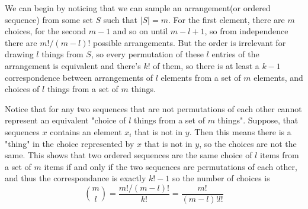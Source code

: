\documentclass[11pt,onecolumn]{article}
\begin{document}
\begin{answer}

We can begin by noticing that we can sample an arrangement(or ordered sequence) from some set $S$ such that $|S|=m$. For the first element, there are $m$ choices, for the second $m-1$ and so on until $m-l+1$, so from independence there are $m!/(m-l)!$ possible arrangements. But the order is irrelevant for drawing $l$ things from $S$, so every permutation of these $l$ entries of the arrangement is equivalent and there's $k!$ of them, so there is at least a $k-1$ correspondence between arrangements of $l$ elements from a set of $m$ elements, and choices of $l$ things from a set of $m$ things. 

Notice that for any two sequences that are not permutations of each other cannot represent an equivalent "choice of $l$ things from a set of $m$ things". Suppose, that sequences $x$ contains an element $x_i$ that is not in $y$. Then this means there is a "thing" in the choice represented by $x$ that is not in $y$, so the choices are not the same. This shows that two ordered sequences are the same choice of $l$ items from a set of $m$ items if and only if the two sequences are permutations of each other, and thus the correspondance is exactly $k!-1$ so the number of choices is
$$ \binom{m}{l} = \frac{m!/(m-l)!}{k!} = \frac{m!}{(m-l)!l!} $$

\begin{comment}
Choosing $l$ items from a set of $m$ items without replacement amounts to enumerating the elements in the set (listing them as a tuple, where the first entry corresponds to the first enumerated item) which is possible since $m < \infty$, permuting the elements, and choosing the first $l$ elements in the permutation. There are $m!$ ways of permuting the tuple of size $m$, but we dont care about the order of the first $l$ elements, or the order of the last $m-l$ elements, Hence, 
$$ \binom{m}{l} = \frac{m!}{l!(m-l)!} $$

Another way to see this: we can enumerate the items in the set $S$ that we are sampling from, so that we can represent any subset as a binary vector $v$ where $v_i = 1$ if the ith item is in the subset of interest, and $v_i = 0$ otherwise. Then, choosing a subset $H \subseteq S$ such that $|H|=l$ amounts to finding a binary vector $v$ with exactly $l$ ones. There are $m!$ permutations of such a vector $v$, but since the $0$ and $1$ respectively are not unique, then any permutation of the 0s or 1s is indistinguible and we have a total of $m!/(l!(m-l)!)$ possible, distinct vectors $v$.
\end{comment}
\end{answer}
\end{document}
